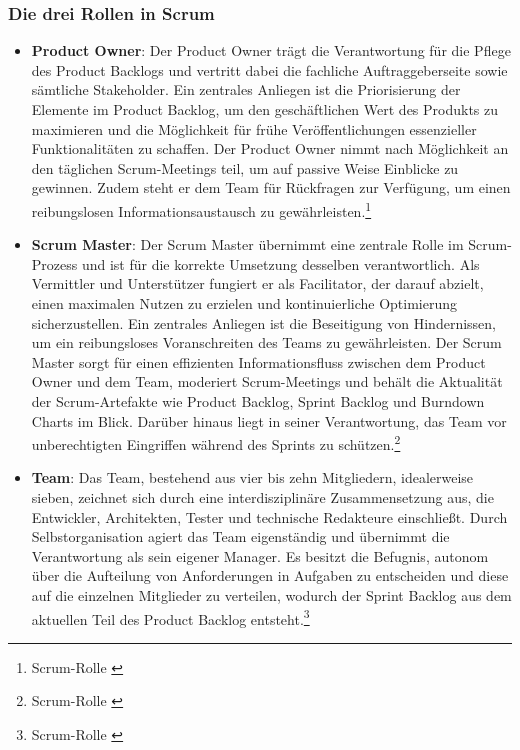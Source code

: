 \subsubsection{Die drei Rollen in Scrum}
\begin{itemize}
    \item \textbf{Product Owner}: Der Product Owner trägt die Verantwortung
    für die Pflege des Product Backlogs und vertritt dabei die fachliche Auftraggeberseite sowie sämtliche Stakeholder.
    Ein zentrales Anliegen ist die Priorisierung der Elemente im Product Backlog, um den geschäftlichen Wert des
    Produkts zu maximieren und die Möglichkeit für frühe Veröffentlichungen essenzieller Funktionalitäten zu schaffen.
    Der Product Owner nimmt nach Möglichkeit an den täglichen Scrum-Meetings teil, um auf passive Weise Einblicke zu
    gewinnen. Zudem steht er dem Team für Rückfragen zur Verfügung, um einen reibungslosen Informationsaustausch zu gewährleisten.\footnote{Scrum-Rolle \cite{Product-Owner}}
    \item \textbf{Scrum Master}: Der Scrum Master übernimmt eine zentrale
    Rolle im Scrum-Prozess und ist für die korrekte Umsetzung desselben verantwortlich. Als Vermittler und Unterstützer
    fungiert er als Facilitator, der darauf abzielt, einen maximalen Nutzen zu erzielen und kontinuierliche Optimierung
    sicherzustellen. Ein zentrales Anliegen ist die Beseitigung von Hindernissen, um ein reibungsloses Voranschreiten
    des Teams zu gewährleisten. Der Scrum Master sorgt für einen effizienten Informationsfluss zwischen dem Product Owner
    und dem Team, moderiert Scrum-Meetings und behält die Aktualität der Scrum-Artefakte wie Product Backlog,
    Sprint Backlog und Burndown Charts im Blick. Darüber hinaus liegt in seiner Verantwortung, das Team vor
    unberechtigten Eingriffen während des Sprints zu schützen.\footnote{Scrum-Rolle \cite{Scrum-Master}}
    \item \textbf{Team}: Das Team, bestehend aus vier bis zehn Mitgliedern,
    idealerweise sieben, zeichnet sich durch eine interdisziplinäre Zusammensetzung aus, die Entwickler, Architekten,
    Tester und technische Redakteure einschließt. Durch Selbstorganisation agiert das Team eigenständig und übernimmt
    die Verantwortung als sein eigener Manager. Es besitzt die Befugnis, autonom über die Aufteilung von Anforderungen
    in Aufgaben zu entscheiden und diese auf die einzelnen Mitglieder zu verteilen, wodurch der Sprint Backlog aus dem
    aktuellen Teil des Product Backlog entsteht.\footnote{Scrum-Rolle \cite{Team}}
\end{itemize}
